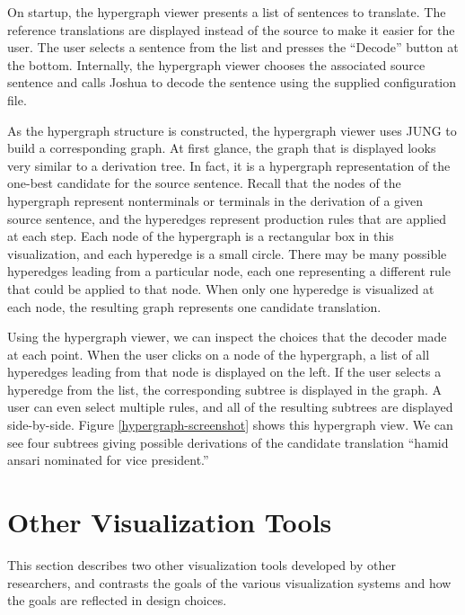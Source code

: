 \documentclass[logo]{pbml}
\begin{document}
On startup, the hypergraph viewer presents a list of sentences to translate.
The reference translations are displayed instead of the source to make it easier for the user. The user selects a sentence from the list and presses the ``Decode'' button at the bottom. Internally, the hypergraph viewer chooses the associated source sentence and calls Joshua to decode the sentence using the supplied
configuration file.

As the hypergraph structure is constructed, the
hypergraph viewer uses JUNG to build a corresponding graph. At first glance,
the graph that is displayed looks very similar to a derivation tree. In fact,
it is a hypergraph representation of the one-best candidate for the source
sentence.
Recall that the nodes of the hypergraph represent nonterminals or terminals in
the derivation of a given source sentence, and the hyperedges represent
production rules that are applied at each step.
Each node of the hypergraph is a rectangular box in this visualization, and
each hyperedge is a small circle. There may be many possible hyperedges leading
from a particular node, each one representing a different rule that could
be applied to that node. When only one hyperedge is visualized at each node,
the resulting graph represents one candidate translation.

Using the hypergraph viewer, we can inspect the choices that the decoder made
at each point. When the user clicks on a node of the hypergraph, a list of all
hyperedges leading from that node is displayed on the left. If the user selects
a hyperedge from the list, the corresponding subtree is displayed in the graph.
A user can even select multiple rules, and all of the resulting subtrees are
displayed side-by-side.
Figure \ref{hypergraph-screenshot} shows this hypergraph view.
We can see four subtrees giving possible derivations of the 
candidate translation
``hamid ansari nominated for vice president.''

\section{Other Visualization Tools}

This section describes two other visualization tools developed by other
researchers, and contrasts the goals of the various visualization systems and
how the goals are reflected in design choices.
\end{document}
